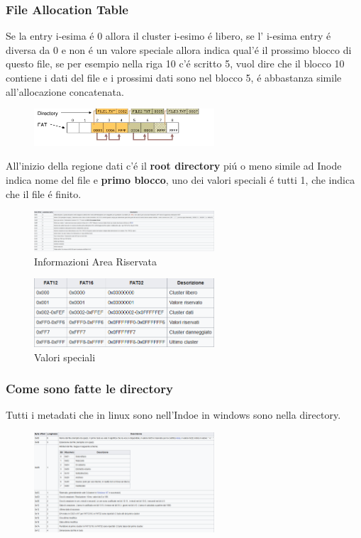 \subsubsection*{File Allocation Table}
Se la entry i-esima é 0 allora il cluster i-esimo é libero, se l' i-esima entry é diversa da 0 e non é un valore speciale allora indica
qual'é il prossimo blocco di questo file, se per esempio nella riga 10 c'é scritto 5, vuol dire che il blocco 10 contiene i dati del file e i prossimi dati sono nel blocco 5,
é abbastanza simile all'allocazione concatenata.
\begin{figure}[H]
    \centering
    \includegraphics[width=0.6\textwidth]{immagini/FATPratico}
\end{figure}
All'inizio della regione dati c'é il \textbf{root directory} piú o meno simile ad Inode indica nome del file e \textbf{primo blocco}, uno
dei valori speciali é tutti 1, che indica che il file é finito.
\begin{figure}[H]
    \centering
    \includegraphics[width=0.6\textwidth]{immagini/InformazioniAreaRiservata}
    \caption{Informazioni Area Riservata}
\end{figure}
\begin{figure}[H]
    \centering
    \includegraphics[width=0.6\textwidth]{immagini/ValoriSpeciali}
    \caption{Valori speciali}
\end{figure}
\subsubsection*{Come sono fatte le directory}
Tutti i metadati che in linux sono nell'Indoe in windows sono nella directory.
\begin{figure}[H]
    \centering
    \includegraphics[width=0.6\textwidth]{immagini/TabellaDirectory}
\end{figure}

